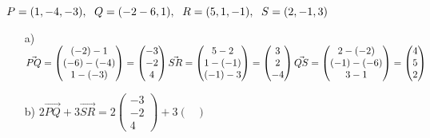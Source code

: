 \subsection{}
\begin{math}
	P=(1, -4, -3),
	\hspace{6px}
	Q=(-2 -6, 1),
	\hspace{6px}
	R=(5, 1, -1),
	\hspace{6px}
	S=(2, -1, 3)
\end{math}
\begin{enumerate}
	\item[a)]
		\begin{math}
			\vec{PQ}
			=\begin{pmatrix}
				(-2)-1\\
				(-6)-(-4)\\
				1-(-3)
			\end{pmatrix}
			=\begin{pmatrix}
				-3\\
				-2\\
				4
			\end{pmatrix}
			\\
			\vec{SR}
			=\begin{pmatrix}
				5-2\\
				1-(-1)\\
				(-1)-3
			\end{pmatrix}
			=\begin{pmatrix}
				3\\
				2\\
				-4
			\end{pmatrix}
			\\
			\vec{QS}
			=\begin{pmatrix}
				2-(-2)\\
				(-1)-(-6)\\
				3-1
			\end{pmatrix}
			=\begin{pmatrix}
				4\\
				5\\
				2
			\end{pmatrix}
		\end{math}
	\item[b)]
		\begin{math}
			2\vec{PQ}+3\vec{SR}
			=2\begin{pmatrix}
				-3\\
				-2\\
				4
			\end{pmatrix}
			+3\begin{pmatrix}

\end{pmatrix}
\end{math}
\end{enumerate}
